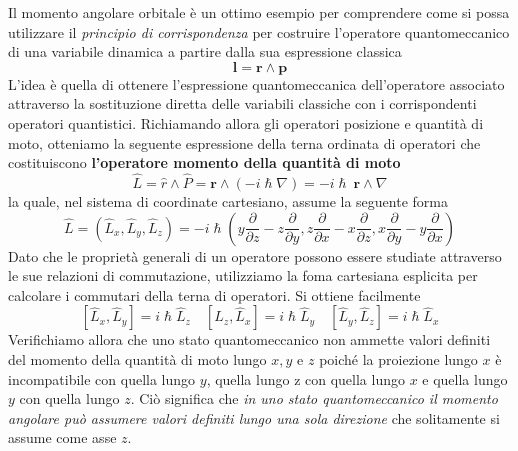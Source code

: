 Il momento angolare orbitale è un ottimo esempio per comprendere come si
possa utilizzare il \emph{principio di corrispondenza} per costruire
l'operatore quantomeccanico di una variabile dinamica a partire dalla
sua espressione classica
\[
	\bm{l}  = \bm{r} \wedge \bm{p}
\]
L'idea è quella di ottenere l'espressione quantomeccanica
dell'operatore associato attraverso la sostituzione diretta delle
variabili classiche con i corrispondenti operatori quantistici.
Richiamando allora gli operatori posizione e quantità di moto, otteniamo
la seguente espressione della terna ordinata di operatori che
costituiscono \textbf{l'operatore momento della quantità di moto}
\[
	\hat{L} = \hat{r} \wedge \hat{P}=\bm{r} \wedge (- i \hslash \nabla) = - i \hslash \ \bm{r} \wedge \nabla
\]
la quale, nel sistema di coordinate cartesiano, assume la seguente forma
\[
	\hat{L} = (\hat{L}_{x}, \hat{L}_{y}, \hat{L}_{z}) = - i \hslash \left( y \frac{\partial}{\partial z} - z \frac{\partial}{\partial y},z \frac{\partial}{\partial x}-x \frac{\partial}{\partial z}, x \frac{\partial}{\partial y} - y \frac{\partial}{\partial x} \right)
\] Dato che le proprietà generali di un operatore possono essere
studiate attraverso le sue relazioni di commutazione, utilizziamo la
foma cartesiana esplicita per calcolare i commutari della terna di
operatori.
Si ottiene facilmente
\[
	[\hat{L}_{x},\hat{L}_{y}] = i \hslash  \hat{L}_{z} \quad
	[\hat{L}_{z},\hat{L}_{x}] = i \hslash  \hat{L}_{y} \quad
	[\hat{L}_{y},\hat{L}_{z}] = i \hslash  \hat{L}_{x}
\]
Verifichiamo allora che uno stato quantomeccanico non ammette valori
definiti del momento della quantità di moto lungo \(x, y\) e \(z\)
poiché la proiezione lungo \(x\) è incompatibile con quella lungo \(y\),
quella lungo z con quella lungo \(x\) e quella lungo \(y\) con quella
lungo \(z\).
Ciò significa che \emph{in uno stato quantomeccanico il
	momento angolare può assumere valori definiti lungo una sola direzione}
che solitamente si assume come asse \(z\).

